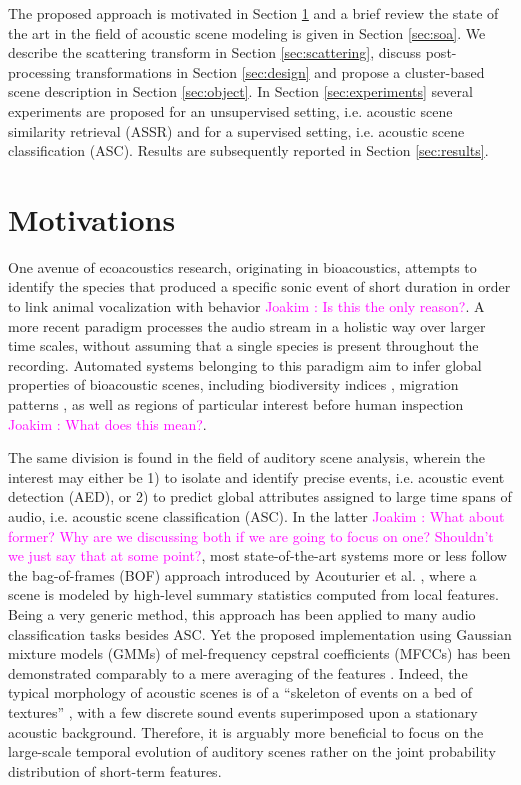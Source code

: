 \documentclass[journal]{IEEEtran}
\makeatletter
\newcommand*{\ie}{i.e.\@\xspace}
\newcommand{\ja}[1]{\textcolor{magenta}{Joakim : #1}}
\makeatother
\begin{document}
The proposed approach is motivated in Section \ref{sec:motivations} and a brief review the state of the art in the field of acoustic scene modeling is given in Section \ref{sec:soa}. We describe the scattering transform in Section \ref{sec:scattering}, discuss post-processing transformations in Section \ref{sec:design} and propose a cluster-based scene description in Section \ref{sec:object}. In Section \ref{sec:experiments} several experiments are proposed for an unsupervised setting, \ie acoustic scene similarity retrieval (ASSR) and for a supervised setting, \ie acoustic scene classification (ASC). Results are subsequently reported in Section \ref{sec:results}.

\section{Motivations} \label{sec:motivations}

One avenue of ecoacoustics research, originating in bioacoustics, attempts to identify the species that produced a specific sonic event of short duration in order to link animal vocalization with behavior\cite{au2008principles, stowell2014large} \ja{Is this the only reason?}.
A more recent paradigm processes the audio stream in a holistic way over larger time scales, without assuming that a single species is present throughout the recording. Automated systems belonging to this paradigm aim to infer global properties of bioacoustic scenes, including biodiversity indices \cite{Bardeli2010}, migration patterns \cite{Obrist2010}, as well as regions of particular interest before human inspection \cite{rosenstock2002landbird,diefenbach2007incorporating} \ja{What does this mean?}.

The same division is found in the field of auditory scene analysis, wherein the interest may either be 1) to isolate and identify precise events, \ie acoustic event detection (AED), or 2) to predict global attributes assigned to large time spans of audio, \ie acoustic scene classification (ASC).
In the latter \ja{What about former? Why are we discussing both if we are going to focus on one? Shouldn't we just say that at some point?}, most state-of-the-art systems more or less follow the bag-of-frames (BOF) approach introduced by Acouturier et al. \cite{aucouturier2007bag}, where a scene is modeled by high-level summary statistics computed from local features.
Being a very generic method, this approach has been applied to many audio classification tasks besides ASC.
Yet the proposed implementation using Gaussian mixture models (GMMs) of mel-frequency cepstral coefficients (MFCCs) has been demonstrated comparably to a mere averaging of the features \cite{lagrange:hal-01082501}.
Indeed, the typical morphology of acoustic scenes is of a ``skeleton of events on a bed of textures'' \cite{nelken_ear_2013}, with a few discrete sound events superimposed upon a stationary acoustic background.
Therefore, it is arguably more beneficial to focus on the large-scale temporal evolution of auditory scenes rather on the joint probability distribution of short-term features.
\end{document}
